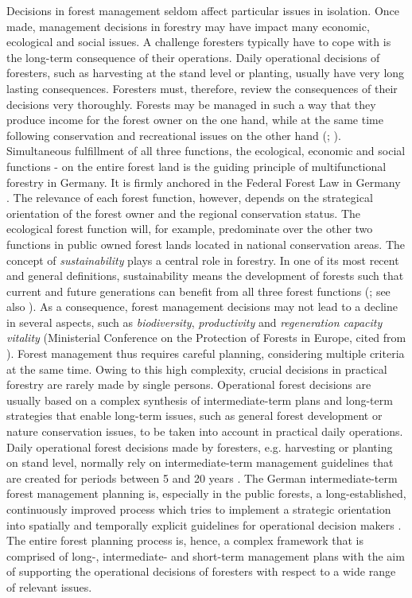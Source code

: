 Decisions in forest management seldom affect particular issues in isolation. Once made, management decisions in forestry may have impact many economic, ecological and social issues. A challenge foresters typically have to cope with is the long-term consequence of their operations. Daily operational decisions of foresters, such as harvesting at the stand level or planting, usually have very long lasting consequences. Foresters must, therefore, review the consequences of their decisions very thoroughly. Forests may be managed in such a way that they produce income for the forest owner on the one hand, while at the same time following conservation and recreational issues on the other hand (\citealp[p. 11]{kangas_2015}; \citealp[p. 67]{mohring_1997}). Simultaneous fulfillment of all three functions, the ecological, economic and social functions - on the entire forest land is the guiding principle of multifunctional forestry in Germany. It is firmly anchored in the Federal Forest Law in Germany \citep[p. 457]{moller_2007}. The relevance of each forest function, however, depends on the strategical orientation of the forest owner and the regional conservation status. The ecological forest function will, for example, predominate over the other two functions in public owned forest lands located in national conservation areas. The concept of \textit{sustainability} plays a central role in forestry. In one of its most recent and general definitions, sustainability means the development of forests such that current and future generations can benefit from all three forest functions (\citealp[p. 14]{un_2005}; see also \citealp[p. 14]{kangas_2015}). As a consequence, forest management decisions may not lead to a decline in several aspects, such as \textit{biodiversity}, \textit{productivity} and \textit{regeneration capacity vitality} (Ministerial Conference on the Protection of Forests in Europe, cited from \citealp[p. 15]{kangas_2015}). Forest management thus requires careful planning, considering multiple criteria at the same time. Owing to this high complexity, crucial decisions in practical forestry are rarely made by single persons. Operational forest decisions are usually based on a complex synthesis of intermediate-term plans and long-term strategies that enable long-term issues, such as general forest development or nature conservation issues, to be taken into account in practical daily operations. Daily operational forest decisions made by foresters, e.g. harvesting or planting on stand level, normally rely on intermediate-term management guidelines that are created for periods between 5 and 20 years \citep[p. 12]{kangas_2015}. The German intermediate-term forest management planning is, especially in the public forests, a long-established, continuously improved process which tries to implement a strategic orientation into spatially and temporally explicit guidelines for operational decision makers \citep[p. 156-158]{bockmann_2004}. The entire forest planning process is, hence, a complex framework that is comprised of long-, intermediate- and short-term management plans with the aim of supporting the operational decisions of foresters with respect to a wide range of relevant issues.

